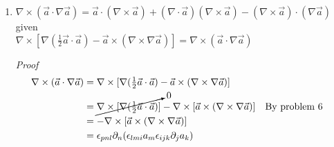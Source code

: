\documentclass[11pt,twoside]{article}
\renewcommand{\d}{\partial}
\newcommand{\vect}[1]{\vec{#1}}
\newcommand{\grad}{\nabla}
\newcommand{\cross}{\times}
\newcommand{\inline}[1]{\mbox{$#1$}}
\begin{document}
\begin{enumerate}
%
%
\item $\grad\cross(\vect{a}\cdot\grad\vect{a}) = \vect{a}\cdot(\grad\cross\vect{a})+(\grad\cdot\vect{a})(\grad\cross\vect{a})- (\grad\cross\vect{a})\cdot(\grad\vect{a})$\\
given \\
$\grad\cross[\grad(\inline{\frac{1}{2}}\vect{a}\cdot\vect{a})-\vect{a}\cross(\grad\cross\grad\vect{a})] = \grad\cross(\vect{a}\cdot\grad\vect{a})$

\textit{Proof}
\begin{align*}
\grad\cross(\vect{a}\cdot\grad\vect{a}) 
       & = \grad\cross[\grad(\inline{\frac{1}{2}}\vect{a}\cdot\vect{a})-\vect{a}\cross(\grad\cross\grad\vect{a})] \\
       & = \cancelto{0}{\grad\cross[\grad(\inline{\frac{1}{2}}\vect{a}\cdot\vect{a})]}-\grad\cross[\vect{a}\cross(\grad\cross\grad\vect{a})] && \text{By problem 6}\\
       & = - \grad\cross[\vect{a}\cross(\grad\cross\grad\vect{a})]\\
       & = \epsilon_{pnl}\d_n(\epsilon_{lmi}a_m \epsilon_{ijk}\d_ja_k) \\
\end{align*}


\end{enumerate}
\end{document}
